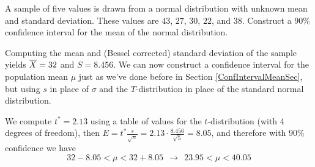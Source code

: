 \begin{examp}\label{TIntExample} A sample of five values is drawn from a normal distribution with unknown mean and standard deviation. These values are $43$, $27$, $30$, $22$, and $38$. Construct a 90\% confidence interval for the mean of the normal distribution.
\par
\noindent Computing the mean and (Bessel corrected) standard deviation of the sample yields ${\overline{X}} = 32$ and $S = 8.456$. We can now construct a confidence interval for the population mean $\mu$ just as we've done before in Section \ref{ConfIntervalMeanSec}, but using $s$ in place of $\sigma$ and the $T$-distribution in place of the standard normal distribution.
\begin{center}
\end{center}
\noindent We compute $t^* = 2.13$ using a table of values for the $t$-distribution (with 4 degrees of freedom), then $E = t^{*} \frac{s}{\sqrt{n}} = 2.13 \cdot \frac{8.456}{\sqrt{5}} = 8.05$, and therefore with $90\%$ confidence we have
$$32 - 8.05 < \mu < 32 + 8.05 \ \ \rightarrow \ \ 23.95 < \mu < 40.05$$
\end{examp}

